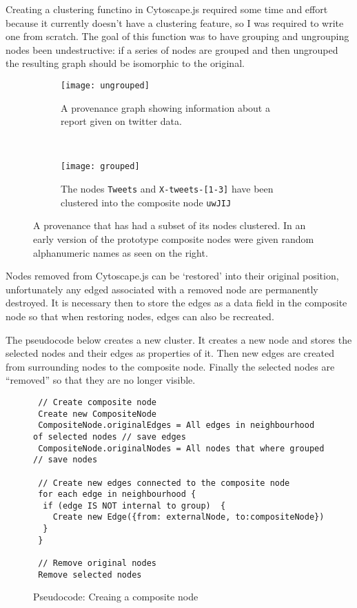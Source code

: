 Creating a clustering functino in Cytoscape.js required some time and effort because it currently doesn't have a clustering feature, so I was required to write one from scratch. The goal of this function was to have grouping and ungrouping nodes been undestructive: if a series of nodes are grouped and then ungrouped the resulting graph should be isomorphic to the original.

\begin{figure}[h]
  \centering
  \begin{subfigure}[t]{0.5\textwidth}
    \texttt{[image: ungrouped]}
    \caption{A provenance graph showing information about a report given on twitter data.}
  \end{subfigure}
  ~
  \begin{subfigure}[t]{0.5\textwidth}
    \texttt{[image: grouped]}
	\caption{The nodes \texttt{Tweets} and \texttt{X-tweets-[1-3]} have been clustered into the composite node \texttt{uwJIJ}}
  \end{subfigure}
  \caption{A provenance that has had a subset of its nodes clustered. In an early version of the prototype composite nodes were given random alphanumeric names as seen on the right.}
\end{figure}

Nodes removed from Cytoscape.js can be `restored' into their original position, unfortunately any edged associated with a removed node are permanently destroyed. It is necessary then to store the edges as a data field in the composite node so that when restoring nodes, edges can also be recreated. 

The pseudocode below creates a new cluster. It creates a new node and stores the selected nodes and their edges as properties of it. Then new edges are created from surrounding nodes to the composite node. Finally the selected nodes are ``removed'' so that they are no longer visible.

\begin{figure}[h]
  \centering
  \begin{lstlisting}
 // Create composite node 
 Create new CompositeNode 
 CompositeNode.originalEdges = All edges in neighbourhood of selected nodes // save edges
 CompositeNode.originalNodes = All nodes that where grouped // save nodes

 // Create new edges connected to the composite node
 for each edge in neighbourhood {
  if (edge IS NOT internal to group)  {
    Create new Edge({from: externalNode, to:compositeNode})
  }
 }

 // Remove original nodes
 Remove selected nodes
 \end{lstlisting}
 \caption{Pseudocode: Creaing a composite node}
\end{figure}

